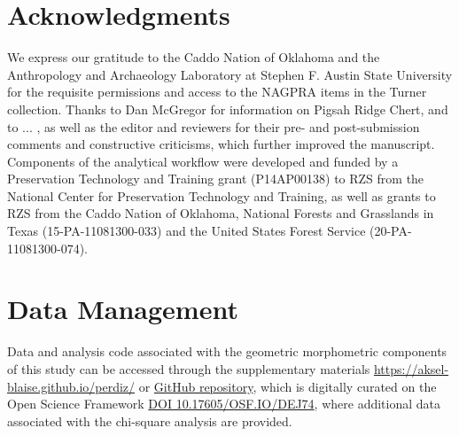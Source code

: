 \documentclass[review]{elsarticle}
\begin{document}
\section*{Acknowledgments}

We express our gratitude to the Caddo Nation of Oklahoma and the Anthropology and Archaeology Laboratory at Stephen F. Austin State University for the requisite permissions and access to the NAGPRA items in the Turner collection. Thanks to Dan McGregor for information on Pigsah Ridge Chert, and to ... , as well as the editor and reviewers for their pre- and post-submission comments and constructive criticisms, which further improved the manuscript. Components of the analytical workflow were developed and funded by a Preservation Technology and Training grant (P14AP00138) to RZS from the National Center for Preservation Technology and Training, as well as grants to RZS from the Caddo Nation of Oklahoma, National Forests and Grasslands in Texas (15-PA-11081300-033) and the United States Forest Service (20-PA-11081300-074).

\section*{Data Management}

Data and analysis code associated with the geometric morphometric components of this study can be accessed through the supplementary materials \href{https://aksel-blaise.github.io/perdiz/}{https://aksel-blaise.github.io/perdiz/} or \href{https://github.com/aksel-blaise/perdiz}{GitHub repository}, which is digitally curated on the Open Science Framework \href{https://osf.io/dej74/}{DOI 10.17605/OSF.IO/DEJ74}, where additional data associated with the chi-square analysis are provided.


\end{document}
